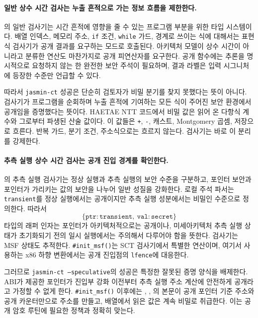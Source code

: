 \documentclass[10pt,twocolumn]{article}
\newcommand{\haetae}{HAETAE}
\newcommand{\ct}{상수 시간}
\newcommand{\sct}{추측 실행 상수 시간}
\begin{document}
\paragraph{일반 \ct{} 검사는 누출 흔적으로 가는 정보 흐름을 제한한다.}
의 일반 검사기는 시간 흔적에 영향을 줄 수
있는 프로그램 부분을 위한 타입 시스템이다. 배열 인덱스, 메모리 주소,
\texttt{if} 조건, \texttt{while} 가드, 경계로 쓰이는 식에 대해서는
표현식 검사기가 공개 결과를 요구하는 모드로 호출된다. 아키텍처 모델이
상수 시간이 아니라고 분류한 연산도 마찬가지로 공개 피연산자를 요구한다.
공개 함수에는 추론을 명시적으로 요청하지 않는 한 완전한 보안 주석이
필요하며, 결과 라벨은 입력 시그니처에 등장한 수준만 언급할 수 있다.

따라서 \texttt{jasmin-ct} 성공은 단순히 검토자가 비밀 분기를 찾지
못했다는 뜻이 아니다. 검사기가 프로그램을 순회하며 누출 흔적에
기여하는 모든 식이 주어진 보안 환경에서 공개임을 증명했다는 뜻이다.
\haetae{} NTT 코드에서 비밀 값은 읽어 온 다항식 계수와 그로부터
파생된 산술 값이다. 이 값들은 \texttt{+}, \texttt{-}, 캐스트,
Montgomery 곱셈, 저장으로 흐른다. 반복 가드, 분기 조건, 주소식으로는
흐르지 않는다. 검사기는 바로 이 분리를 강제한다.

\paragraph{\sct{} 검사는 공개 진입 경계를 확인한다.}
의 추측 실행 검사기는 정상 실행과
추측 실행의 보안 수준을 구분하고, 포인터 보안과 포인터가
가리키는 값의 보안을 나누어 일반 성질을 강화한다. 로컬 주석 파서는
\texttt{transient}를 정상 실행에서는 공개이지만 추측 실행 성분에서는
비밀인 수준으로 정의한다. 따라서
\[
  \{\texttt{ptr}:\texttt{transient},\ \texttt{val}:\texttt{secret}\}
\]
타입의 래퍼 인자는 포인터가 아키텍처적으로는 공개이나,
미세아키텍처 추측 실행 상태가 초기화되기 전의 일시 실행에서는
주의해서 다루어야 함을 뜻한다. 검사기는 MSF 상태도 추적한다.
\texttt{\#init\_msf()}는 SCT 검사기에서 특별한 연산이며, 여기서 사용하는
x86 하향 변환에서는 공개 진입점의 \texttt{lfence}에 대응한다.

그러므로 \texttt{jasmin-ct --speculative}의 성공은 특정한 잘못된 증명
양식을 배제한다. ABI가 제공한 포인터가 진입부 강화 이전부터
추측 실행 주소 계산에 안전하게 공개라고 가정할 수 없게 한다.
\texttt{\#init\_msf()} 이후에는 , ,
의 본문이 공개 포인터 기준 주소와 공개 카운터만으로
주소를 만들고, 배열에서 읽은 값은 계속 비밀로 취급한다. 이는 공개
암호 루틴에 필요한 정책과 정확히 맞는다.
\end{document}

